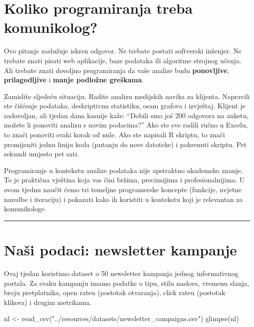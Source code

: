 \documentclass[
  croatian,
  letterpaper,
  DIV=11,
  numbers=noendperiod]{scrartcl}
\newenvironment{Shaded}{\begin{snugshade}}{\end{snugshade}}
\newcommand{\FunctionTok}[1]{\textcolor[rgb]{0.28,0.35,0.67}{#1}}
\newcommand{\NormalTok}[1]{\textcolor[rgb]{0.00,0.23,0.31}{#1}}
\newcommand{\OtherTok}[1]{\textcolor[rgb]{0.00,0.23,0.31}{#1}}
\newcommand{\StringTok}[1]{\textcolor[rgb]{0.13,0.47,0.30}{#1}}
\begin{document}
\section{Koliko programiranja treba
komunikolog?}\label{koliko-programiranja-treba-komunikolog}

Ovo pitanje zaslužuje iskren odgovor. Ne trebate postati softverski
inženjer. Ne trebate znati pisati web aplikacije, baze podataka ili
algoritme strojnog učenja. Ali trebate znati dovoljno programiranja da
vaše analize budu \textbf{ponovljive}, \textbf{prilagodljive} i
\textbf{manje podložne greškama}.

Zamislite sljedeću situaciju. Radite analizu medijskih navika za
klijenta. Napravili ste čišćenje podataka, deskriptivnu statistiku, osam
grafova i izvještaj. Klijent je zadovoljan, ali tjedan dana kasnije
kaže: ``Dobili smo još 200 odgovora na anketu, možete li ponoviti
analizu s novim podacima?'' Ako ste sve radili ručno u Excelu, to znači
ponoviti svaki korak od nule. Ako ste napisali R skriptu, to znači
promijeniti jednu liniju koda (putanju do nove datoteke) i pokrenuti
skriptu. Pet sekundi umjesto pet sati.

Programiranje u kontekstu analize podataka nije apstraktno akademsko
znanje. To je praktična vještina koja vas čini bržima, preciznijima i
profesionalnijima. U ovom tjednu naučit ćemo tri temeljne programerske
koncepte (funkcije, uvjetne naredbe i iteraciju) i pokazati kako ih
koristiti u kontekstu koji je relevantan za komunikologe.

\begin{center}\rule{0.5\linewidth}{0.5pt}\end{center}

\section{Naši podaci: newsletter kampanje}\label{sec-podaci}

Ovaj tjedan koristimo dataset o 50 newsletter kampanja jednog
informativnog portala. Za svaku kampanju imamo podatke o tipu, stilu
naslova, vremenu slanja, broju pretplatnika, open rateu (postotak
otvaranja), click rateu (postotak klikova) i drugim metrikama.

\begin{Shaded}
\begin{Highlighting}[]
\NormalTok{nl }\OtherTok{\textless{}{-}} \FunctionTok{read\_csv}\NormalTok{(}\StringTok{"../resources/datasets/newsletter\_campaigns.csv"}\NormalTok{)}
\FunctionTok{glimpse}\NormalTok{(nl)}
\end{Highlighting}
\end{Shaded}
\end{document}

